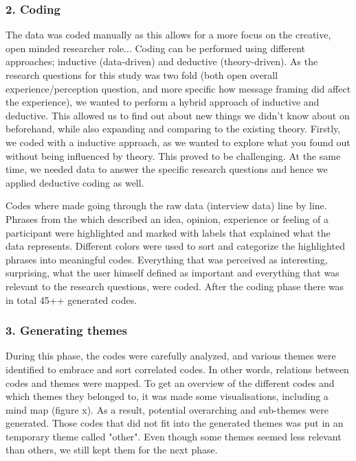     \subsubsection{2. Coding}
    The data was coded manually as this allows for a more focus on the creative, open minded researcher role... 
   Coding can be performed using different approaches; inductive (data-driven) and deductive (theory-driven). As the research questions for this study was two fold (both open overall experience/perception question, and more specific how message framing did affect the experience), we wanted to perform a hybrid approach of inductive and deductive. This allowed us to find out about new things we didn't know about on beforehand, while also expanding and comparing to the existing theory. 
   Firstly, we coded with a inductive approach, as we wanted to explore what you found out without being influenced by theory.  This proved to be challenging. At the same time, we needed data to answer the specific research questions and hence we applied deductive coding as well. 
    
    Codes where made going through the raw data (interview data) line by line. Phrases from the which described an idea, opinion, experience or feeling of a participant were highlighted and marked with labels that explained what the data represents. Different colors were used to sort and categorize the highlighted phrases into meaningful codes. Everything that was perceived as interesting, surprising, what the user himself defined as important and everything that was relevant to the research questions, were coded.  After the coding phase there was in total 45++ generated codes.  
    \subsubsection{3. Generating themes}
During this phase, the codes were carefully analyzed, and various themes were identified to embrace and sort correlated codes. In other words, relations between codes and themes were mapped. To get an overview of the different codes and which themes they belonged to, it was made some visualisations, including a mind map (figure x). As a result, potential overarching and sub-themes were generated. Those codes that did not fit into the generated themes was put in an temporary theme called "other". Even though some themes seemed less relevant than others, we still kept them for the next phase. 

